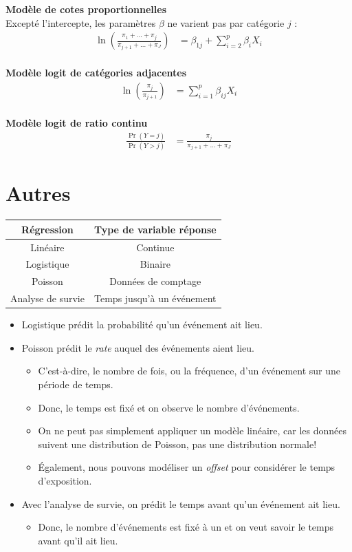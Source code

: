\documentclass[10pt, french]{article}
\begin{document}
\begin{multicols*}{2}
\textbf{Modèle de cotes proportionnelles}	\\
Excepté l'intercepte, les paramètres $\beta$ ne varient pas par catégorie $j$ :
\begin{align*}
	\ln\left(\frac{\pi_{1} + \hdots + \pi_{j}}{\pi_{j + 1} + \hdots + \pi_{J}}\right)
	&=	\beta_{1j} + \sum_{i	=	2}^{p}\beta_{i}X_{i}	\\
\end{align*}

\textbf{Modèle logit de catégories adjacentes}
\begin{align*}
	\ln\left(\frac{\pi_{j}}{\pi_{j + 1}}\right)
	&=	\sum_{i	=	1}^{p}\beta_{ij}X_{i}	\\
\end{align*}

\textbf{Modèle logit de ratio continu}
\begin{align*}
	\frac{\Pr(Y	=	j)}{\Pr(Y	>	j)}
	&=	\frac{\pi_{j}}{\pi_{j + 1} + \hdots + \pi_{J}}
\end{align*}


\pagebreak
\section{Autres}
\begin{tabular}{|	c	|	c	|}
Régression	&	Type de variable réponse	\\\hline
Linéaire		&	Continue	\\
Logistique	&	Binaire	\\
Poisson		&	Données de comptage	\\
Analyse de survie	&	Temps jusqu'à un événement	\\
\end{tabular}
\begin{itemize}
	\item	Logistique prédit la probabilité qu'un événement ait lieu.
	\item	Poisson prédit le \og \textit{rate} \fg{} auquel des événements aient lieu.
		\begin{itemize}
		\item	C'est-à-dire, le nombre de fois, ou la fréquence, d'un événement sur une période de temps.
		\item	Donc, le temps est fixé et on observe le nombre d'événements.
		\item	On ne peut pas simplement appliquer un modèle linéaire, car les données suivent une distribution de Poisson, pas une distribution normale! 
		\item	Également, nous pouvons modéliser un \og \textit{offset} \fg{} pour considérer le temps d'exposition.
		\end{itemize}
	\item	Avec l'analyse de survie, on prédit le temps avant qu'un événement ait lieu.
		\begin{itemize}
		\item	Donc, le nombre d'événements est fixé à un et on veut savoir le temps avant qu'il ait lieu.
		\end{itemize}
\end{itemize}


\end{multicols*}
\end{document}

